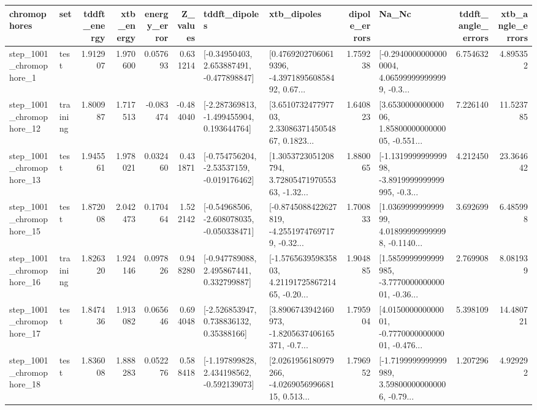 \begin{tabular}{llrrrrllrlrr}
\toprule
             chromophores &       set &  tddft\_energy &  xtb\_energy &  energy\_error &  Z\_values &                               tddft\_dipoles &                                        xtb\_dipoles &  dipole\_errors &                                              Na\_Nc &  tddft\_angle\_errors &  xtb\_angle\_errors \\
\midrule
  step\_1001\_chromophore\_1 &      test &      1.912907 &    1.970600 &      0.057693 &  0.631214 &    [-0.34950403, 2.653887491, -0.477898847] &  [0.47692027060619396, -4.397189560858492, 0.67... &       1.759238 &  [-0.29400000000000004, 4.065999999999999, -0.3... &            6.754632 &          4.895352 \\
 step\_1001\_chromophore\_12 &  training &      1.800987 &    1.717513 &     -0.083474 & -0.484040 &   [-2.287369813, -1.499455904, 0.193644764] &  [3.651073247797703, 2.3308637145054867, 0.1823... &       1.640823 &  [3.653000000000006, 1.8580000000000005, -0.551... &            7.226140 &         11.523785 \\
 step\_1001\_chromophore\_13 &      test &      1.945561 &    1.978021 &      0.032460 &  0.431871 &   [-0.754756204, -2.53537159, -0.019176462] &  [1.3053723051208794, 3.7280547197055363, -1.32... &       1.880065 &  [-1.131999999999998, -3.8919999999999995, -0.3... &            4.212450 &         23.364642 \\
 step\_1001\_chromophore\_15 &      test &      1.872008 &    2.042473 &      0.170464 &  1.522142 &   [-0.54968506, -2.608078035, -0.050338471] &  [-0.8745088422627819, -4.25519747697179, -0.32... &       1.700833 &  [1.036999999999999, 4.018999999999998, -0.1140... &            3.692699 &          6.485998 \\
 step\_1001\_chromophore\_16 &  training &      1.826320 &    1.924146 &      0.097826 &  0.948280 &    [-0.947789088, 2.495867441, 0.332799887] &  [-1.576563959835803, 4.2119172586721465, -0.20... &       1.904885 &  [1.5859999999999985, -3.777000000000001, -0.36... &            2.769908 &          8.081939 \\
 step\_1001\_chromophore\_17 &      test &      1.847436 &    1.913082 &      0.065646 &  0.694048 &     [-2.526853947, 0.738836132, 0.35388166] &  [3.8906743942460973, -1.8205637406165371, -0.7... &       1.795904 &  [4.015000000000001, -0.777000000000001, -0.476... &            5.398109 &         14.480721 \\
 step\_1001\_chromophore\_18 &      test &      1.836008 &    1.888283 &      0.052276 &  0.588418 &   [-1.197899828, 2.434198562, -0.592139073] &  [2.0261956180979266, -4.026905699668115, 0.513... &       1.796952 &  [-1.7199999999999989, 3.598000000000006, -0.79... &            1.207296 &          4.929292 \\

\end{tabular}
